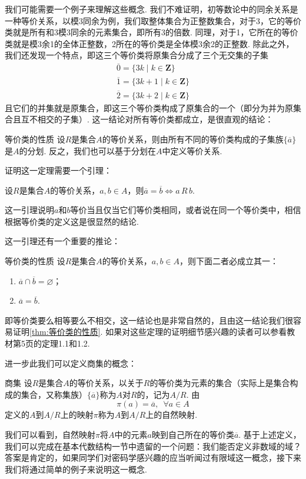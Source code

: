 我们可能需要一个例子来理解这些概念. 我们不难证明，初等数论中的同余关系是一种等价关系，以模3同余为例，我们取整体集合为正整数集合，对于3，它的等价类就是所有和3模3同余的元素集合，即所有3的倍数. 同理，对于1，它所在的等价类就是模3余1的全体正整数，2所在的等价类是全体模3余2的正整数. 除此之外，我们还发现一个特点，即这三个等价类将原集合分成了三个无交集的子集
\begin{gather*}
    \overline{0}=\{3k\mid k\in\mathbf{Z}\} \\
    \overline{1}=\{3k+1\mid k\in\mathbf{Z}\} \\
    \overline{2}=\{3k+2\mid k\in\mathbf{Z}\}
\end{gather*}
且它们的并集就是原集合，即这三个等价类构成了原集合的一个（即分为并为原集合且互不相交的子集）. 这一结论对所有等价类都成立，是很直观的结论：
\begin{theorem}{}{等价类的性质}
    设$R$是集合$A$的等价关系，则由所有不同的等价类构成的子集族$\{\overline{a}\}$是$A$的分划. 反之，我们也可以基于分划在$A$中定义等价关系.
\end{theorem}

证明这一定理需要一个引理：
\begin{lemma}{}{}
    设$R$是集合$A$的等价关系，$a,b\in A$，则$\overline{a}=\overline{b}\iff a\,R\,b$.
\end{lemma}
这一引理说明$a$和$b$等价当且仅当它们等价类相同，或者说在同一个等价类中，相信根据等价类的定义这是很显然的结论.

这一引理还有一个重要的推论：
\begin{corollary}{}{等价类的性质}
    设$R$是集合$A$的等价关系，$a,b\in A$，则下面二者必成立其一：
    \begin{enumerate}
        \item $\overline{a}\cap\overline{b}=\varnothing$；

        \item $\overline{a}=\overline{b}$.
    \end{enumerate}
\end{corollary}
即等价类要么相等要么不相交，这一结论也是非常自然的，且由这一结论我们很容易证明\autoref{thm:等价类的性质}. 如果对这些定理的证明细节感兴趣的读者可以参看教材第5页的定理1.1和1.2.

进一步此我们可以定义商集的概念：
\begin{definition}{商集}{} 
    设$R$是集合$A$的等价关系，以关于$R$的等价类为元素的集合（实际上是集合构成的集合，又称集族）$\{\overline{a}\}$称为$A$对$R$的，记为$A/R$. 由
    \[\pi(a) = \overline{a}, \enspace \forall a\in A\]
    定义的$A$到$A/R$上的映射$\pi$称为$A$到$A/R$上的自然映射.
\end{definition}
我们可以看到，自然映射$\pi$将$A$中的元素$a$映到自己所在的等价类$\overline{a}$. 基于上述定义，我们可以完成在基本代数结构一节中遗留的一个问题：我们能否定义非数域的域？答案是肯定的，如果同学们对密码学感兴趣的应当听闻过有限域这一概念，接下来我们将通过简单的例子来说明这一概念.

